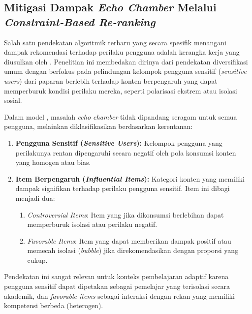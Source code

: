 \subsection{Mitigasi Dampak \textit{Echo Chamber} Melalui \textit{Constraint-Based Re-ranking}}
\label{ssec:debiasio_reranking}

Salah satu pendekatan algoritmik terbaru yang secara spesifik menangani dampak rekomendasi terhadap perilaku pengguna adalah kerangka kerja yang diusulkan oleh \textcite{DeBiasio2023}. Penelitian ini membedakan dirinya dari pendekatan diversifikasi umum dengan berfokus pada pelindungan kelompok pengguna sensitif (\textit{sensitive users}) dari paparan berlebih terhadap konten berpengaruh yang dapat memperburuk kondisi perilaku mereka, seperti polarisasi ekstrem atau isolasi sosial.

Dalam model \textcite{DeBiasio2023}, masalah \textit{echo chamber} tidak dipandang seragam untuk semua pengguna, melainkan diklasifikasikan berdasarkan kerentanan:
\begin{enumerate}
    \item \textbf{Pengguna Sensitif (\textit{Sensitive Users}):} Kelompok pengguna yang perilakunya rentan dipengaruhi secara negatif oleh pola konsumsi konten yang homogen atau bias.
    \item \textbf{Item Berpengaruh (\textit{Influential Items}):} Kategori konten yang memiliki dampak signifikan terhadap perilaku pengguna sensitif. Item ini dibagi menjadi dua:
    \begin{enumerate}
        \item \textit{Controversial Items}: Item yang jika dikonsumsi berlebihan dapat memperburuk isolasi atau perilaku negatif.
        \item \textit{Favorable Items}: Item yang dapat memberikan dampak positif atau memecah isolasi (\textit{bubble}) jika direkomendasikan dengan proporsi yang cukup.
    \end{enumerate}
\end{enumerate}

Pendekatan ini sangat relevan untuk konteks pembelajaran adaptif karena pengguna sensitif dapat dipetakan sebagai pemelajar yang terisolasi secara akademik, dan \textit{favorable items} sebagai interaksi dengan rekan yang memiliki kompetensi berbeda (heterogen).

